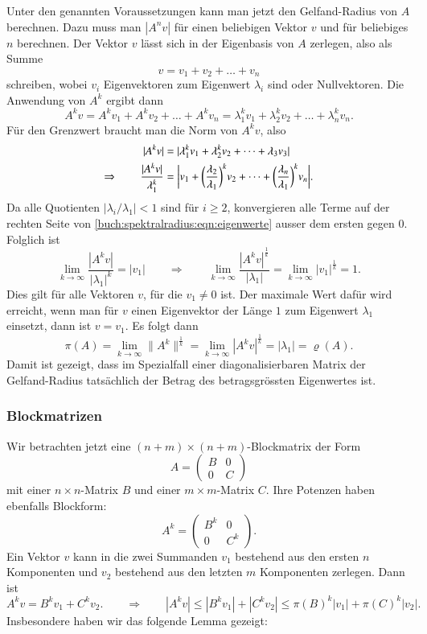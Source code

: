 Unter den genannten Voraussetzungen kann man jetzt den Gelfand-Radius
von $A$ berechnen.
Dazu muss man $|A^nv|$ für einen beliebigen Vektor $v$ und für
beliebiges $n$ berechnen.
Der Vektor $v$ lässt sich in der Eigenbasis von $A$ zerlegen, also
als Summe
%
\[
v = v_1+v_2+\dots+v_n
\]
schreiben, wobei $v_i$ Eigenvektoren zum Eigenwert $\lambda_i$ sind oder
Nullvektoren.
Die Anwendung von $A^k$ ergibt dann
\[
A^k v
=
A^k v_1 + A^k v_2 + \dots + A^k v_n
=
\lambda_1^k v_1 + \lambda_2^k v_2 + \dots + \lambda_n^k v_n.
\]
Für den Grenzwert braucht man die Norm von $A^kv$, also
\begin{align}
|A^kv|
&= |\lambda_1^k v_1 + \lambda_2^k v_2 + \dots + \lambda_3 v_3|
\notag
\\
\Rightarrow\qquad
\frac{|A^kv|}{\lambda_1^k}
&=
\biggl|
v_1 +
\biggl(\frac{\lambda_2}{\lambda_1}\biggr)^k v_2
+
\dots
+
\biggl(\frac{\lambda_n}{\lambda_1}\biggr)^k v_n
\biggr|.
\label{buch:spektralradius:eqn:eigenwerte}
\end{align}
Da alle Quotienten $|\lambda_i/\lambda_1|<1$ sind für $i\ge 2$,
konvergieren alle Terme auf der rechten Seite von
\eqref{buch:spektralradius:eqn:eigenwerte}
ausser dem ersten gegen $0$.
Folglich ist
\[
\lim_{k\to\infty} \frac{|A^kv|}{|\lambda_1|^k}
=
|v_1|
\qquad\Rightarrow\qquad
\lim_{k\to\infty} \frac{|A^kv|^\frac1k}{|\lambda_1|}
=
\lim_{k\to\infty}|v_1|^{\frac1k}
=
1.
\]
Dies gilt für alle Vektoren $v$, für die $v_1\ne 0$ ist.
Der maximale Wert dafür wird erreicht, wenn man für 
$v$ einen Eigenvektor der Länge $1$ zum Eigenwert $\lambda_1$ einsetzt,
dann ist $v=v_1$.
Es folgt dann
\[
\pi(A)
=
\lim_{k\to\infty} \| A^k\|^\frac1k
=
\lim_{k\to\infty} |A^kv|^\frac1k
=
|\lambda_1|
=
\varrho(A).
\]
Damit ist gezeigt, dass im Spezialfall einer diagonalisierbaren Matrix der
Gelfand-Radius tatsächlich der Betrag des betragsgrössten Eigenwertes ist.
%

\subsubsection{Blockmatrizen}
Wir betrachten jetzt eine $(n+m)\times(n+m)$-Blockmatrix der Form
\begin{equation}
A = \begin{pmatrix} B & 0 \\ 0 & C\end{pmatrix}
\label{buch:spektralradius:eqn:blockmatrix}
\end{equation}
mit einer $n\times n$-Matrix $B$ und einer $m\times m$-Matrix $C$.
Ihre Potenzen haben ebenfalls Blockform:
\[
A^k = \begin{pmatrix} B^k & 0 \\ 0 & C^k\end{pmatrix}.
\]
Ein Vektor $v$ kann in die zwei Summanden $v_1$ bestehend aus den
ersten $n$ Komponenten und $v_2$ bestehend aus den letzten $m$ 
Komponenten zerlegen.
Dann ist
\[
A^kv = B^kv_1 + C^kv_2.
\qquad\Rightarrow\qquad
|A^kv|
\le
|B^kv_1| + |C^kv_2|
\le 
\pi(B)^k |v_1| + \pi(C)^k |v_2|.
\]
Insbesondere haben wir das folgende Lemma gezeigt:

